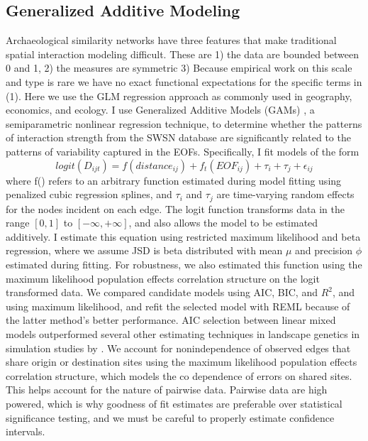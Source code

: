 \documentclass[10pt]{iopart}
\begin{document}
\subsection*{Generalized Additive Modeling}
Archaeological similarity networks have three features that make traditional spatial interaction modeling difficult. These are 1) the data are bounded between 0 and 1, 2) the measures are symmetric
3) Because empirical work on this scale and type is rare we have no exact functional expectations for the specific terms in (1).
Here we use the GLM regression approach as commonly used in geography, economics, and ecology. I use Generalized Additive Models (GAMs) \parencite{Wood2006a}, a semiparametric nonlinear regression technique, to determine whether the patterns of interaction strength from the SWSN database are significantly related to the patterns of variability captured in the EOFs. Specifically, I fit models of the form
\begin{equation}
    logit\left(D_{ijt}\right) = f(distance_{ij}) + f_t(EOF_{ij}) + \tau_i + \tau_j + \epsilon_{ij}
\end{equation}
where f() refers to an arbitrary function estimated during model fitting using penalized cubic regression splines, and $\tau_i$ and $\tau_j$ are time-varying random effects for the nodes incident on each edge. The logit function transforms data in the range $[0, 1]$ to $[-\infty, +\infty]$, and also allows the model to be estimated additively. I estimate this equation using restricted maximum likelihood and beta regression, where we assume JSD is beta distributed with mean $\mu$ and precision $\phi$ estimated during fitting. For robustness, we also estimated this function using the maximum likelihood population effects correlation structure on the logit transformed data. We compared candidate models using AIC, BIC, and $R^2$, and using maximum likelihood, and refit the selected model with REML because of the latter method's better performance. AIC selection between linear mixed models outperformed several other estimating techniques in landscape genetics in simulation studies by \parencite{Shirk et al 2018}. We account for nonindependence of observed edges that share origin or destination sites using the maximum likelihood population effects correlation structure, which models the co dependence of errors on shared sites. This helps account for the nature of pairwise data. Pairwise data are high powered, which is why goodness of fit estimates are preferable over statistical significance testing, and we must be careful to properly estimate confidence intervals.
\end{document}
